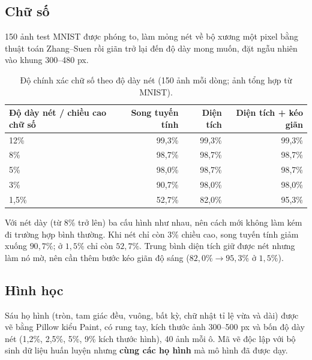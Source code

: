 \subsection{Chữ số}
150 ảnh test MNIST được phóng to, làm mỏng nét về bộ xương một pixel bằng thuật toán Zhang--Suen \cite{zhang1984} rồi giãn trở lại đến độ dày mong muốn, đặt ngẫu nhiên vào khung 300--480 px.

\begin{table}[H]\centering
\begin{tabular}{lrrr}
\toprule
Độ dày nét / chiều cao chữ số & Song tuyến tính & Diện tích & Diện tích + kéo giãn \\
\midrule
12\% & 99,3\% & 99,3\% & 99,3\% \\
8\% & 98,7\% & 98,7\% & 98,7\% \\
5\% & 98,0\% & 98,7\% & 98,7\% \\
3\% & 90,7\% & 98,0\% & 98,0\% \\
1,5\% & 52,7\% & 82,0\% & 95,3\% \\
\bottomrule
\end{tabular}
\caption{Độ chính xác chữ số theo độ dày nét (150 ảnh mỗi dòng; ảnh tổng hợp từ MNIST).}
\end{table}

Với nét dày (từ 8\% trở lên) ba cấu hình như nhau, nên cách mới không làm kém đi trường hợp bình thường. Khi nét chỉ còn 3\% chiều cao, song tuyến tính giảm xuống $90{,}7\%$; ở $1{,}5\%$ chỉ còn $52{,}7\%$.
Trung bình diện tích giữ được nét nhưng làm nó mờ, nên cần thêm bước kéo giãn độ sáng ($82{,}0\%\to95{,}3\%$ ở $1{,}5\%$).

\subsection{Hình học}
Sáu họ hình (tròn, tam giác đều, vuông, bất kỳ, chữ nhật tỉ lệ vừa và dài) được vẽ bằng Pillow kiểu Paint, có rung tay, kích thước ảnh 300--500 px và bốn độ dày nét
(1,2\%, 2,5\%, 5\%, 9\% kích thước hình), 40 ảnh mỗi ô. Mã vẽ độc lập với bộ sinh dữ liệu huấn luyện nhưng \textbf{cùng các họ hình} mà mô hình đã được dạy.

